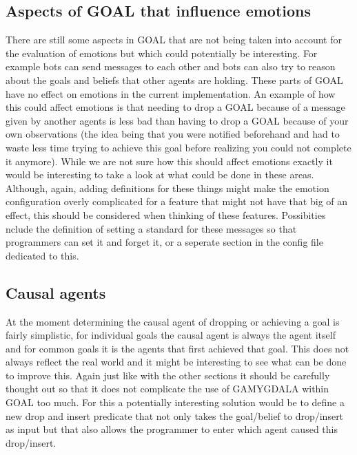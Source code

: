 \documentclass[11pt]{article}
\begin{document}
\subsection{Aspects of GOAL that influence emotions}
There are still some aspects in GOAL that are not being taken into account for the evaluation of emotions but which could potentially be interesting. For example bots can send messages to each other and bots can also try to reason about the goals and beliefs that other agents are holding. These parts of GOAL have no effect on emotions in the current implementation. An example of how this could affect emotions is that needing to drop a GOAL because of a message given by another agents is less bad than having to drop a GOAL because of your own observations (the idea being that you were notified beforehand and had to waste less time trying to achieve this goal before realizing you could not complete it anymore). While we are not sure how this should affect emotions exactly it would be interesting to take a look at what could be done in these areas. Although, again, adding definitions for these things might make the emotion configuration overly complicated for a feature that might not have that big of an effect, this should be considered when thinking of these features. Possibities nclude the definition of setting a standard for these messages so that programmers can set it and forget it, or a seperate section in the config file dedicated to this.

\subsection{Causal agents}
At the moment determining the causal agent of dropping or achieving a goal is fairly simplistic, for individual goals the causal agent is always the agent itself and for common goals it is the agents that first achieved that goal. This does not always reflect the real world and it might be interesting to see what can be done to improve this. Again just like with the other sections it should be carefully thought out so that it does not complicate the use of GAMYGDALA within GOAL too much. For this a potentially interesting solution would be to define a new drop and insert predicate that not only takes the goal/belief to drop/insert as input but that also allows the programmer to enter which agent caused this drop/insert.
\end{document}
